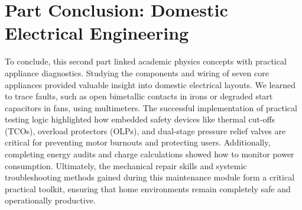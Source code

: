 \documentclass[11pt,a4paper]{report}
\begin{document}
\chapter*{Part Conclusion: Domestic Electrical Engineering}
To conclude, this second part linked academic physics concepts with practical appliance diagnostics. Studying the components and wiring of seven core appliances provided valuable insight into domestic electrical layouts. We learned to trace faults, such as open bimetallic contacts in irons or degraded start capacitors in fans, using multimeters. The successful implementation of practical testing logic highlighted how embedded safety devices like thermal cut-offs (TCOs), overload protectors (OLPs), and dual-stage pressure relief valves are critical for preventing motor burnouts and protecting users. Additionally, completing energy audits and charge calculations showed how to monitor power consumption. Ultimately, the mechanical repair skills and systemic troubleshooting methods gained during this maintenance module form a critical practical toolkit, ensuring that home environments remain completely safe and operationally productive.
\end{document}
